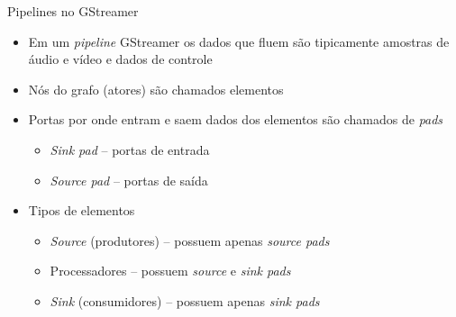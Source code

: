 \documentclass{beamer}
\def\en#1{\foreignlanguage{english}{\emph{#1}}}
\begin{document}
\begin{frame}[c]{Pipelines no GStreamer}
  \begin{itemize}
    \item Em um \en{pipeline} GStreamer os dados que fluem são tipicamente
      amostras de áudio e vídeo e dados de controle
    \item Nós do grafo (atores) são chamados elementos
    \item Portas por onde entram e saem dados dos elementos são chamados de
      \en{pads}
      \begin{itemize}
        \item \en{Sink pad} -- portas de entrada
        \item \en{Source pad} -- portas de saída
      \end{itemize}
    \item Tipos de elementos
      \begin{itemize}
        \item \en{Source} (produtores) -- possuem apenas \en{source pads}
        \item Processadores -- possuem \en{source} e \en{sink pads}
        \item \en{Sink} (consumidores) -- possuem apenas \en{sink pads}
      \end{itemize}
  \end{itemize}
\end{frame}
\end{document}
